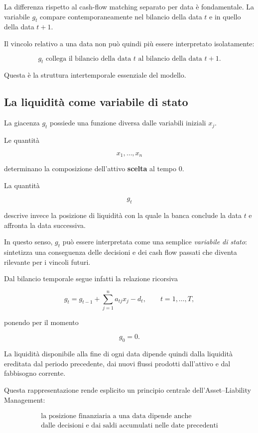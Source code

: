 La differenza rispetto al cash-flow matching separato per data \`e
fondamentale. La variabile $g_t$ compare contemporaneamente nel bilancio
della data $t$ e in quello della data $t+1$.

Il vincolo relativo a una data non pu\`o quindi pi\`u essere interpretato
isolatamente:

\[
\boxed{
g_t
\text{ collega il bilancio della data }t
\text{ al bilancio della data }t+1.
}
\]

Questa \`e la struttura intertemporale essenziale del modello.

\subsection{La liquidit\`a come variabile di stato}

La giacenza $g_t$ possiede una funzione diversa dalle variabili iniziali
$x_j$.

Le quantit\`a

\[
x_1,\ldots,x_n
\]

\noindent determinano la composizione dell'attivo \textbf{scelta} al tempo $0$.

La quantit\`a

\[
g_t
\]

\noindent descrive invece la posizione di liquidit\`a con la quale la banca conclude la
data $t$ e affronta la data successiva.

In questo senso, $g_t$ pu\`o essere interpretata come una semplice
\emph{variabile di stato}: sintetizza una conseguenza delle decisioni e dei
cash flow passati che diventa rilevante per i vincoli futuri.

Dal bilancio temporale segue infatti la relazione ricorsiva

\[
g_t
=
g_{t-1}
+
\sum_{j=1}^{n}a_{tj}x_j
-
d_t,
\qquad
t=1,\ldots,T,
\]

\noindent ponendo per il momento

\[
g_0=0.
\]

La liquidit\`a disponibile alla fine di ogni data dipende quindi dalla
liquidit\`a ereditata dal periodo precedente, dai nuovi flussi prodotti
dall'attivo e dal fabbisogno corrente.

Questa rappresentazione rende esplicito un principio centrale
dell'Asset--Liability Management:

\[
\boxed{
\begin{array}{c}
\text{la posizione finanziaria a una data dipende anche}\\
\text{dalle decisioni e dai saldi accumulati nelle date precedenti}
\end{array}
}
\]

